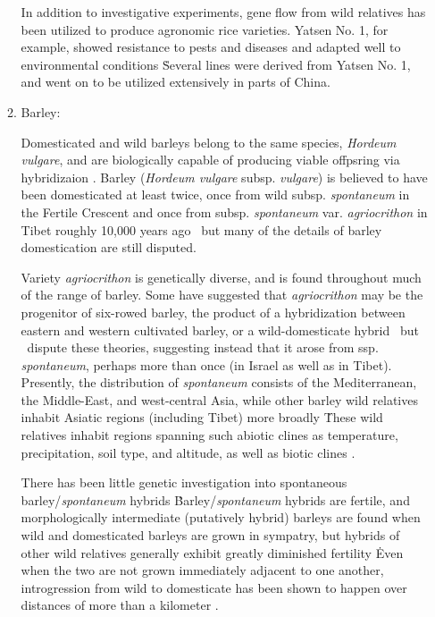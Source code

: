\documentclass[11pt]{article}
\begin{document}
\begin{enumerate}
\begin{enumerate}
In addition to investigative experiments, gene flow from wild relatives has been utilized to produce agronomic rice varieties.
Yatsen No. 1, for example, showed resistance to pests and diseases and adapted well to environmental conditions \cite{ting1933wild}\.
Several lines were derived from Yatsen No. 1, and went on to be utilized extensively in parts of China.





		
	

\item{Barley:}
		
Domesticated and wild barleys belong to the same species, \emph{Hordeum vulgare}, and are biologically capable of producing viable offpsring via hybridizaion \cite{von1995ecographical}.
Barley (\emph{Hordeum vulgare} subsp. \emph{vulgare}) is believed to have been domesticated at least twice, once from wild subsp. \emph{spontaneum} in the Fertile Crescent and once from subsp. \emph{spontaneum} var. \emph{agriocrithon} in Tibet roughly 10,000 years ago \cite{takahashi1955origin, badr2000origin, oka2012origin, azhaguvel2007phylogenetic, haberer2015barley}\, but many of the details of barley domestication are still disputed.


Variety \emph{agriocrithon} is genetically diverse, and is found throughout much of the range of barley.
Some have suggested that \emph{agriocrithon} may be the progenitor of six-rowed barley, the product of a hybridization between eastern and western cultivated barley, or a wild-domesticate hybrid \cite{staudt1961origin, zohary1959hordeum, murphy1982origin}\, but \cite{azhaguvel2007phylogenetic}\ dispute these theories, suggesting instead that it arose from ssp. \emph{spontaneum}, perhaps more than once (in Israel as well as in Tibet).
Presently, the distribution of \emph{spontaneum} consists of the Mediterranean, the Middle-East, and west-central Asia, while other barley wild relatives inhabit Asiatic regions (including Tibet) more broadly \cite{nevo2010drought, harlan1995living, CWR}\.
These wild relatives inhabit regions spanning such abiotic clines as temperature, precipitation, soil type, and altitude, as well as biotic clines \cite{nevo2010drought}.


There has been little genetic investigation into spontaneous barley/\emph{spontaneum} hybrids \cite{ellstrand2003dangerous}\.
Barley/\emph{spontaneum} hybrids are fertile, and morphologically intermediate (putatively hybrid) barleys are found when wild and domesticated barleys are grown in sympatry, but hybrids of other wild relatives generally exhibit greatly diminished fertility \cite{ellstrand2003dangerous, harlan1995living}\.
Even when the two are not grown immediately adjacent to one another, introgression from wild to domesticate has been shown to happen over distances of more than a kilometer \cite{hillman2001new}.



\end{enumerate}
\end{enumerate}
\end{document}

